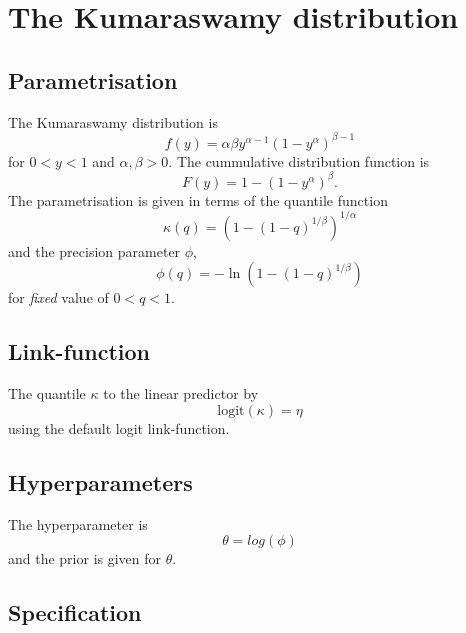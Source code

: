 \documentclass[a4paper,11pt]{article}
\begin{document}
\section*{The Kumaraswamy distribution}

\subsection*{Parametrisation}

The Kumaraswamy distribution is
\begin{displaymath}
    f(y) = \alpha \beta y^{\alpha-1}(1-y^{\alpha})^{\beta-1}
\end{displaymath}
for $0<y<1$ and $\alpha, \beta > 0$. The cummulative distribution
function is
\begin{displaymath}
    F(y) = 1-(1-y^{\alpha})^{\beta}.
\end{displaymath}
The parametrisation is given in terms of the quantile function
\begin{displaymath}
    \kappa(q) = \left(1-(1-q)^{1/\beta}\right)^{1/\alpha}
\end{displaymath}
and the precision parameter $\phi$,
\begin{displaymath}
    \phi(q) = -\ln\left(1-(1-q)^{1/\beta}\right)
\end{displaymath}
for \emph{fixed} value of $0<q<1$.

\subsection*{Link-function}

The quantile $\kappa$ to the linear predictor by
\begin{displaymath}
    \text{logit}(\kappa) = \eta
\end{displaymath}
using the default logit link-function. 

\subsection*{Hyperparameters}

The hyperparameter is
\begin{displaymath}
    \theta = log(\phi)
\end{displaymath}
and the prior is given for $\theta$.

\subsection*{Specification}
\end{document}
